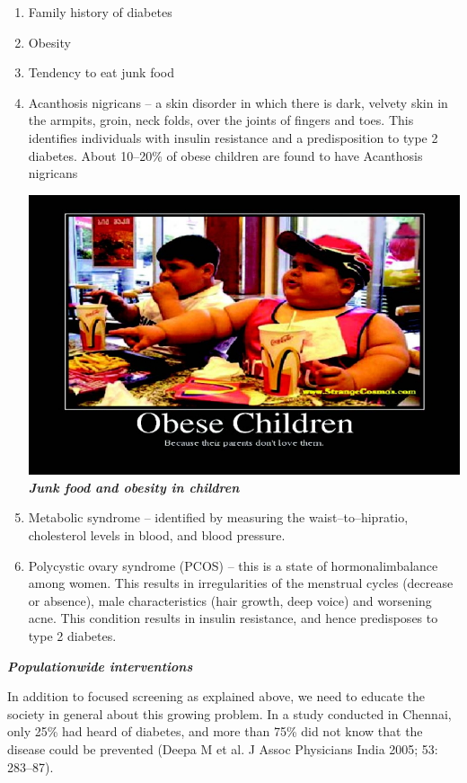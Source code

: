 \begin{enumerate}[•]
\itemsep=0pt
\item Family history of diabetes
\item Obesity
\item Tendency to eat junk food
\item Acanthosis nigricans – a skin disorder in which there is dark, velvety skin in the armpits, groin, neck folds, over the joints of fingers and toes. This identifies individuals with insulin resistance and a predisposition to type 2 diabetes. About 10–20\% of obese children are found to have Acanthosis nigricans

\includegraphics[scale=1.2]{images/026.jpg}\\
\small\textbf{\textit{Junk food and obesity in children}}

\item Metabolic syndrome – identified by measuring the waist–to–hip\break ratio, cholesterol levels in blood, and blood pressure.
\item Polycystic ovary syndrome (PCOS) – this is a state of hormonal\break imbalance among women. This results in irregularities of the menstrual cycles (decrease or absence), male characteristics (hair growth, deep voice) and worsening acne. This condition results in insulin resi\-stance, and hence predisposes to type 2 diabetes.
\end{enumerate}

\noindent\textbf{\textit{Populationwide interventions}}

In addition to focused screening as explained above, we need to educate the society in general about this growing problem. In a study conducted in Chennai, only 25\% had heard of diabetes, and more than 75\% did not know that the disease could be prevented (Deepa M et al. J Assoc Physicians India 2005; 53: 283–87).


